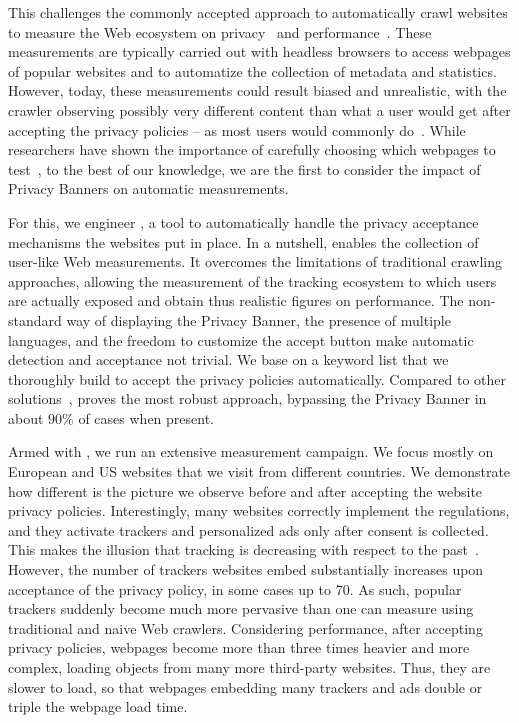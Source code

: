This challenges the commonly accepted approach to automatically crawl websites to measure the Web ecosystem on privacy~\cite{acar2014web,falahrastegar2014rise,metwalley2015online,englehardt2016online,pujol2015annoyed,iordanou2018tracing,hu2019characterising,rizzo2021unveiling,papadogiannakis2021user, vandrevu2019what, pujol2015annoyed, traverso2017benchmark, mazel2019comparison} and performance~\cite{wang2014speedy, de2015http, erman2015towards, bocchi2016measuring, alay2017experience, asrese2019measuring, ruamviboonsuk2017vroom, sivakumar2014parcel, netravali2015mahimahi}. These measurements are typically carried out with headless browsers to access webpages of popular websites and to automatize the collection of metadata and statistics. However, today, these measurements could result biased and unrealistic, with the crawler observing possibly very different content than what a user would get after accepting the privacy policies -- as most users would commonly do~\cite{bauer2021you, hausner2021dark, CookieBenchmarkStudy}. While researchers have shown the importance of carefully choosing which webpages to test~\cite{aqeel2020on}, to the best of our knowledge, we are the first to consider the impact of Privacy Banners on automatic measurements.

For this, we engineer \TOOL, a tool to automatically handle the privacy acceptance mechanisms the websites put in place. In a nutshell, \TOOL enables the collection of user-like Web measurements. It overcomes the limitations of traditional crawling approaches, allowing the measurement of the tracking ecosystem to which users are actually exposed and obtain thus realistic figures on performance. The non-standard way of displaying the Privacy Banner, the presence of multiple languages, and the freedom to customize the accept button make automatic detection and acceptance not trivial. We base \TOOL on a keyword list that we thoroughly build to accept the privacy policies automatically. Compared to other solutions~\cite{idontcare,remove,ninja,consentomatic}, \TOOL proves the most robust approach, bypassing the Privacy Banner in about $90\%$ of cases when present.

Armed with \TOOL, we run an extensive measurement campaign. We focus mostly on European and US websites that we visit from different countries. We demonstrate how different is the picture we observe before and after accepting the website privacy policies. Interestingly, many websites correctly implement the regulations, and they activate trackers and personalized ads only after consent is collected. This makes the illusion that tracking is decreasing with respect to the past~\cite{hu2019characterising}. However, the number of trackers websites embed substantially increases upon acceptance of the privacy policy, in some cases up to 70. As such, popular trackers suddenly become much more pervasive than one can measure using traditional and naive Web crawlers. Considering performance, after accepting privacy policies, webpages become more than three times heavier and more complex, loading objects from many more third-party websites. Thus, they are slower to load, so that webpages embedding many trackers and ads double or triple the webpage load time.

